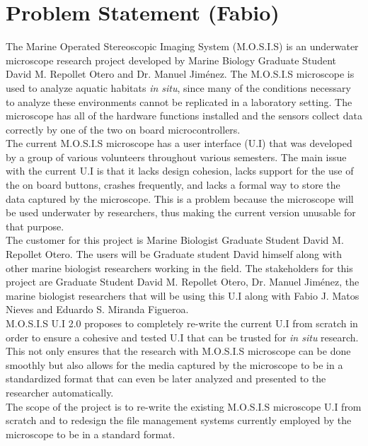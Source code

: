 \section{Problem Statement (Fabio)}
 The Marine Operated Stereoscopic Imaging System (M.O.S.I.S) is an underwater microscope research project developed by Marine Biology Graduate Student David M. Repollet Otero and Dr. Manuel Jiménez.\cite{fernandoguzman3UIMosis2023}\cite{Fabiomatos999} The M.O.S.I.S microscope is used to analyze aquatic habitats \textit{in situ}, since many of the conditions necessary to analyze these environments cannot be replicated in a laboratory setting. The microscope has all of the hardware functions installed and the sensors collect data correctly by one of the two on board microcontrollers.\\ The current M.O.S.I.S microscope has a user interface (U.I) that was developed by a group of various volunteers throughout various semesters. The main issue with the current U.I is that it lacks design cohesion, lacks support for the use of the on board buttons, crashes frequently, and lacks a formal way to store the data captured by the microscope. This is a problem because the microscope will be used underwater by researchers, thus making the current version unusable for that purpose.\\
 The customer for this project is Marine Biologist Graduate Student David M. Repollet Otero. The users will be Graduate student David himself along with other marine biologist researchers working in the field. The stakeholders for this project are Graduate Student David M. Repollet Otero, Dr. Manuel Jiménez, the marine biologist researchers that will be using this U.I along with Fabio J. Matos Nieves and Eduardo S. Miranda Figueroa.\\
 M.O.S.I.S U.I 2.0 proposes to completely re-write the current U.I from scratch in order to ensure a cohesive and tested U.I that can be trusted for \textit{in situ} research. This not only ensures that the research with M.O.S.I.S microscope can be done smoothly but also allows for the media captured by the microscope to be in a standardized format that can even be later analyzed and presented to the researcher automatically.\\
The scope of the project is to re-write the existing M.O.S.I.S microscope U.I from scratch and to redesign the file management systems currently employed by the microscope to be in a standard format.